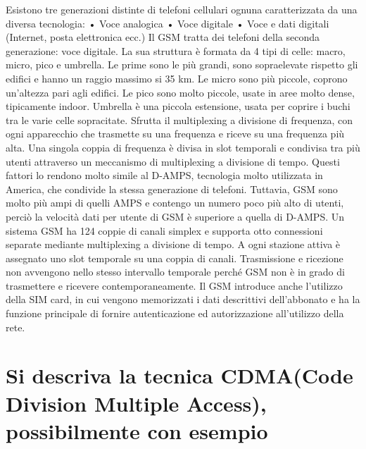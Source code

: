 Esistono tre generazioni distinte di telefoni cellulari ognuna caratterizzata da una diversa tecnologia:
•	Voce analogica
•	Voce digitale
•	Voce e dati digitali (Internet, posta elettronica ecc.)
Il GSM tratta dei telefoni della seconda generazione: voce digitale.
La sua struttura è formata da 4 tipi di celle: macro, micro, pico e umbrella. 
Le prime sono le più grandi, sono sopraelevate rispetto gli edifici e hanno un raggio massimo si 35 km. Le micro sono più piccole, coprono un'altezza pari agli edifici. Le pico sono molto piccole, usate in aree molto dense, tipicamente indoor. Umbrella è una piccola estensione, usata per coprire i buchi tra le varie celle sopracitate.
Sfrutta il multiplexing a divisione di frequenza, con ogni apparecchio che trasmette su una frequenza e riceve su una frequenza più alta. Una singola coppia di frequenza è divisa in slot temporali e condivisa tra più utenti attraverso un meccanismo di multiplexing a divisione di tempo.
Questi fattori lo rendono molto simile al D-AMPS, tecnologia molto utilizzata in America, che condivide la stessa generazione di telefoni. Tuttavia, GSM sono molto più ampi di quelli AMPS e contengo un numero poco più alto di utenti, perciò la velocità dati per utente di GSM è superiore a quella di D-AMPS.
Un sistema GSM ha 124 coppie di canali simplex e supporta otto connessioni separate mediante multiplexing a divisione di tempo.
A ogni stazione attiva è assegnato uno slot temporale su una coppia di canali.
Trasmissione e ricezione non avvengono nello stesso intervallo temporale perché GSM non è in grado di trasmettere e ricevere contemporaneamente.
Il GSM introduce anche l’utilizzo della SIM card, in cui vengono memorizzati i dati descrittivi dell’abbonato e ha la funzione principale di fornire autenticazione ed autorizzazione all’utilizzo della rete.
\section{Si descriva la tecnica CDMA(Code Division Multiple Access), possibilmente con esempio}

